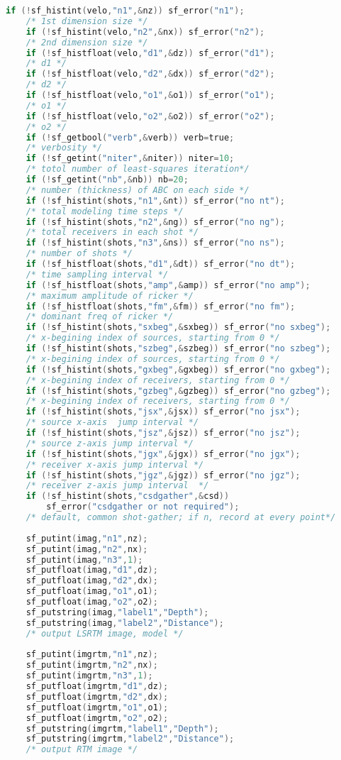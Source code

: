 \documentclass[a4paper,11pt]{article}
\theoremstyle{mytheor}
\begin{document}
\begin{lstlisting}[label={main},language=C,tabsize=4,caption=main()]
	if (!sf_histint(velo,"n1",&nz)) sf_error("n1");
	/* 1st dimension size */
	if (!sf_histint(velo,"n2",&nx)) sf_error("n2");
	/* 2nd dimension size */
	if (!sf_histfloat(velo,"d1",&dz)) sf_error("d1");
	/* d1 */
	if (!sf_histfloat(velo,"d2",&dx)) sf_error("d2");
	/* d2 */
	if (!sf_histfloat(velo,"o1",&o1)) sf_error("o1");
	/* o1 */
	if (!sf_histfloat(velo,"o2",&o2)) sf_error("o2");
	/* o2 */
	if (!sf_getbool("verb",&verb)) verb=true;
	/* verbosity */
	if (!sf_getint("niter",&niter)) niter=10;
	/* totol number of least-squares iteration*/
	if (!sf_getint("nb",&nb)) nb=20;
	/* number (thickness) of ABC on each side */   
	if (!sf_histint(shots,"n1",&nt)) sf_error("no nt");
	/* total modeling time steps */
	if (!sf_histint(shots,"n2",&ng)) sf_error("no ng");
	/* total receivers in each shot */
	if (!sf_histint(shots,"n3",&ns)) sf_error("no ns");
	/* number of shots */
	if (!sf_histfloat(shots,"d1",&dt)) sf_error("no dt");
	/* time sampling interval */
	if (!sf_histfloat(shots,"amp",&amp)) sf_error("no amp");
	/* maximum amplitude of ricker */
	if (!sf_histfloat(shots,"fm",&fm)) sf_error("no fm");
	/* dominant freq of ricker */
	if (!sf_histint(shots,"sxbeg",&sxbeg)) sf_error("no sxbeg");
	/* x-begining index of sources, starting from 0 */
	if (!sf_histint(shots,"szbeg",&szbeg)) sf_error("no szbeg");
	/* x-begining index of sources, starting from 0 */
	if (!sf_histint(shots,"gxbeg",&gxbeg)) sf_error("no gxbeg");
	/* x-begining index of receivers, starting from 0 */
	if (!sf_histint(shots,"gzbeg",&gzbeg)) sf_error("no gzbeg");
	/* x-begining index of receivers, starting from 0 */
	if (!sf_histint(shots,"jsx",&jsx)) sf_error("no jsx");
	/* source x-axis  jump interval */
	if (!sf_histint(shots,"jsz",&jsz)) sf_error("no jsz");
	/* source z-axis jump interval */
	if (!sf_histint(shots,"jgx",&jgx)) sf_error("no jgx");
	/* receiver x-axis jump interval */
	if (!sf_histint(shots,"jgz",&jgz)) sf_error("no jgz");
	/* receiver z-axis jump interval  */
	if (!sf_histint(shots,"csdgather",&csd)) 
		sf_error("csdgather or not required");
	/* default, common shot-gather; if n, record at every point*/
	
	sf_putint(imag,"n1",nz);
	sf_putint(imag,"n2",nx);
	sf_putint(imag,"n3",1);
	sf_putfloat(imag,"d1",dz);
	sf_putfloat(imag,"d2",dx);
	sf_putfloat(imag,"o1",o1);
	sf_putfloat(imag,"o2",o2);
	sf_putstring(imag,"label1","Depth");
	sf_putstring(imag,"label2","Distance");
	/* output LSRTM image, model */
	
	sf_putint(imgrtm,"n1",nz);
	sf_putint(imgrtm,"n2",nx);
	sf_putint(imgrtm,"n3",1);
	sf_putfloat(imgrtm,"d1",dz);
	sf_putfloat(imgrtm,"d2",dx);
	sf_putfloat(imgrtm,"o1",o1);
	sf_putfloat(imgrtm,"o2",o2);
	sf_putstring(imgrtm,"label1","Depth");
	sf_putstring(imgrtm,"label2","Distance");
	/* output RTM image */


\end{lstlisting}
\end{document}
